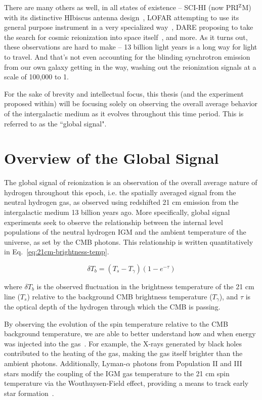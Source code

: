There are many others as well, in all states of existence -- SCI-HI (now 
PRI$^\mathrm{Z}$M) with its distinctive HIbiscus antenna 
design~\citep{voytek2014}, LOFAR attempting to use its general purpose 
instrument in a very specialized way~\citep{rottgering2006}, DARE proposing to 
take the search for cosmic reionization into space itself~\citep{burns2012}, 
and more. As it turns out, these observations are hard to make -- 13 billion 
light years is a long way for light to travel. And that's not even accounting 
for the blinding synchrotron emission from our own galaxy getting in the way, 
washing out the reionization signals at a scale of 100,000 to 1.

For the sake of brevity and intellectual focus, this thesis (and the experiment 
proposed within) will be focusing solely on observing the overall average 
behavior of the intergalactic medium as it evolves throughout this time period.  
This is referred to as the ``global signal".

\section{Overview of the Global Signal}
\label{sec:global-signal-overview}

The global signal of reionization is an observation of the overall average 
nature of hydrogen throughout this epoch, i.e. the spatially averaged signal 
from the neutral hydrogen gas, as observed using redshifted 21 cm emission from 
the intergalactic medium 13 billion years ago. More specifically, global signal 
experiments seek to observe the relationship between the internal level 
populations of the neutral hydrogen IGM and the ambient temperature of the 
universe, as set by the CMB photons.  This relationship is written 
quantitatively in Eq.~\eqref{eq:21cm-brightness-temp}.

\begin{equation}
    \delta T_b = (T_s - T_\gamma)(1 - e^{-\tau})
    \label{eq:21cm-brightness-temp}
\end{equation}

\noindent where $\delta T_b$ is the observed fluctuation in the brightness 
temperature of the 21 cm line ($T_s$) relative to the background CMB brightness 
temperature ($T_\gamma$), and $\tau$ is the optical depth of the hydrogen 
through which the CMB is passing. 

By observing the evolution of the spin temperature relative to the CMB 
background temperature, we are able to better understand how and when energy 
was injected into the gas~\citep{pritchard-loeb2010}. For example, the X-rays 
generated by black holes contributed to the heating of the gas, making the gas 
itself brighter than the ambient photons. Additionally, Lyman-$\alpha$ photons 
from Population II and III stars modify the coupling of the IGM gas temperature 
to the 21 cm spin temperature via the Wouthuysen-Field effect, providing a 
means to track early star formation~\citep{furlanetto2006}.


